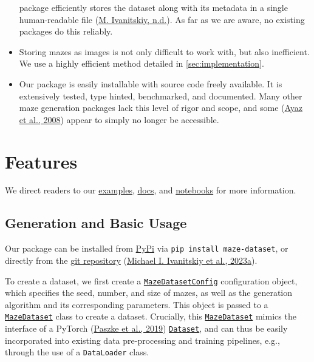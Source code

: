\documentclass[10pt,a4paper,onecolumn]{article}
\begin{document}
\begin{itemize}
  package efficiently stores the dataset along with its metadata in a
  single human-readable file (\protect\hyperlink{ref-zanj}{M.
  Ivanitskiy, n.d.}). As far as we are aware, no existing packages do
  this reliably.
\item
  Storing mazes as images is not only difficult to work with, but also
  inefficient. We use a highly efficient method detailed in
  \autoref{sec:implementation}.
\item
  Our package is easily installable with source code freely available.
  It is extensively tested, type hinted, benchmarked, and documented.
  Many other maze generation packages lack this level of rigor and
  scope, and some (\protect\hyperlink{ref-ayaz2008maze}{Ayaz et al.,
  2008}) appear to simply no longer be accessible.
\end{itemize}

\hypertarget{features}{%
\section{Features}\label{features}}

We direct readers to our
\href{https://understanding-search.github.io/maze-dataset/examples/maze_examples.html}{examples},
\href{https://understanding-search.github.io/maze-dataset/maze_dataset.html}{docs},
and
\href{https://understanding-search.github.io/maze-dataset/notebooks/}{notebooks}
for more information.

\hypertarget{generation}{%
\subsection{Generation and Basic Usage}\label{generation}}

Our package can be installed from
\href{https://pypi.org/project/maze-dataset/}{PyPi} via
\texttt{pip\ install\ maze-dataset}, or directly from the
\href{https://github.com/understanding-search/maze-dataset}{git
repository} (\protect\hyperlink{ref-maze-dataset-github}{Michael I.
Ivanitskiy et al., 2023a}).

To create a dataset, we first create a
\href{https://understanding-search.github.io/maze-dataset/maze_dataset.html\#MazeDatasetConfig}{\texttt{MazeDatasetConfig}}
configuration object, which specifies the seed, number, and size of
mazes, as well as the generation algorithm and its corresponding
parameters. This object is passed to a
\href{https://understanding-search.github.io/maze-dataset/maze_dataset.html\#MazeDataset}{\texttt{MazeDataset}}
class to create a dataset. Crucially, this
\href{https://understanding-search.github.io/maze-dataset/maze_dataset.html\#MazeDataset}{\texttt{MazeDataset}}
mimics the interface of a PyTorch
(\protect\hyperlink{ref-pytorch}{Paszke et al., 2019})
\href{https://pytorch.org/docs/stable/data.html}{\texttt{Dataset}}, and
can thus be easily incorporated into existing data pre-processing and
training pipelines, e.g., through the use of a \texttt{DataLoader}
class.
\end{document}
